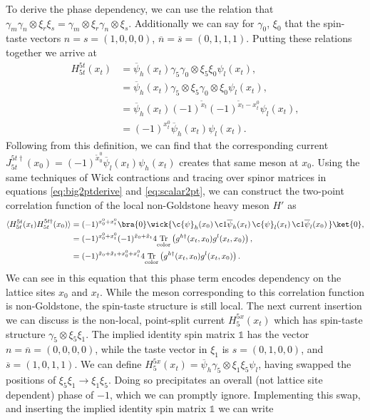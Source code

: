 To derive the phase dependency, we can use the relation that $\gamma_m\gamma_n \otimes \xi_r\xi_s = \gamma_m\otimes\xi_r \gamma_n \otimes \xi_s$.  Additionally we can say for $\gamma_0$, $\xi_0$ that the spin-taste vectors $n = s = (1,0,0,0)$, $\overline{n} = \overline{s} = (0,1,1,1)$.   Putting these relations together we arrive at
\begin{equation}\label{eq:tvec2ptderive}
\begin{split}
    H^{5t}_{5t}(x_t) &= \overline{\psi}_h(x_t) \gamma_5\gamma_0 \otimes \xi_5\xi_0 \psi_l(x_t),\\
    &= \overline{\psi}_h(x_t) \gamma_5\otimes\xi_5\gamma_0 \otimes \xi_0 \psi_l(x_t),\\
    &= \overline{\psi}_h(x_t) (-1)^{\tilde{x}_t}(-1)^{\tilde{x}_t-x_t^0} \psi_l(x_t),\\
    &= (-1)^{{x}^0_t} \overline{\psi}_h(x_t) \psi_l(x_t).
\end{split}
\end{equation}
Following from this definition, we can find that the corresponding current $J^{5t\dagger}_{5t}(x_0)=(-1)^{\tilde{x}^0_0} \overline{\psi}_l(x_t) \psi_h(x_t)$ creates that same meson at $x_0$.  Using the same techniques of Wick contractions and tracing over spinor matrices in equations \ref{eq:big2ptderive} and \ref{eq:scalar2pt}, we can construct the two-point correlation function of the local non-Goldstone heavy meson $H'$ as
\begin{equation}\label{eq:tvec2ptderivept2}
\begin{split}
    \langle H^{5t}_{5t}(x_t) H^{5t\dagger}_{5t}(x_0)\rangle &=  (-1)^{x^0_0+x^0_t} \bra{0}\wick{ \c{\psi}_h(x_0) \, \c1{\overline{\psi}}_h(x_t)\,
    \c{\psi}_l(x_t) \, \c1{\overline{\psi}}_l(x_0)\,}\ket{0},\\
    &= (-1)^{x^0_0+x^0_t} (-1)^{\tilde{x}_0+\tilde{x}_t}4\mathrm{\underset{{color}}{Tr}}\left(g^{h\dagger}(x_t,x_0)g^l(x_t,x_0)\right),\\
    &=(-1)^{\tilde{x}_0+\tilde{x}_t+x^0_0+x^0_t} 4\mathrm{\underset{{color}}{Tr}}\left(g^{h\dagger}(x_t,x_0)g^l(x_t,x_0)\right).
\end{split}
\end{equation}
We can see in this equation that this phase term encodes dependency on the lattice sites $x_0$ and $x_t$.  While the meson corresponding to this correlation function is non-Goldstone, the spin-taste structure is still local.  The next current insertion we can discuss is the non-local, point-split current $H^{5x}_5(x_t)$ which has spin-taste structure $\gamma_5 \otimes \xi_5\xi_1$.  The implied identity spin matrix $\mathds{1}$ has the vector $n = \overline{n} = (0,0,0,0)$, while the taste vector in $\xi_1$ is $s = (0,1,0,0)$, and $\overline{s}=(1,0,1,1)$. We can define $H^{5x}_5(x_t)=\overline{\psi}_h\gamma_5 \otimes \xi_1\xi_5 \psi_l$, having swapped the positions of $\xi_5\xi_1\rightarrow\xi_1\xi_5$.  Doing so precipitates an overall (not lattice site dependent) phase of $-1$, which we can promptly ignore. Implementing this swap, and inserting the implied identity spin matrix $\mathds{1}$ we can write
